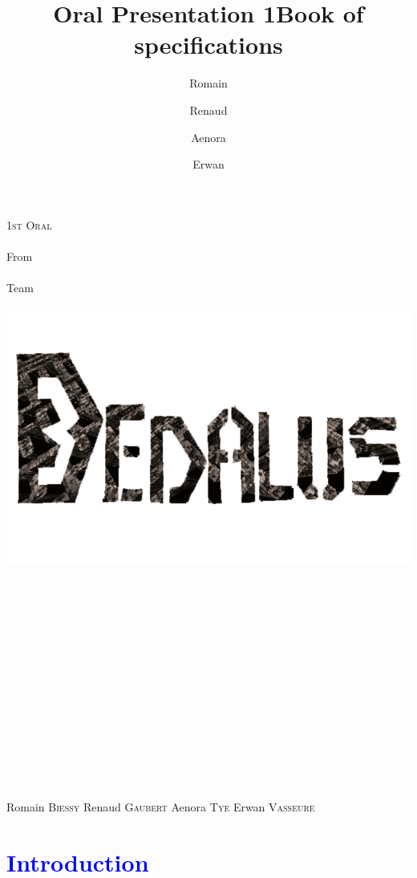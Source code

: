 \documentclass[article]{report} %
\title {Oral Presentation 1}
\title {Book of specifications}
\author {Romain\and Renaud\and Aenora\and Erwan}
\date {}
\begin{document}
	\thispagestyle{empty}
  	\begin{titlepage} 
		\vspace*{1cm} 
  		\begin{center} 
  			{\huge{\textsc{1st Oral} \\ ~ \\{\large From}\\ ~\\ Team \\  ~ \\ }}
	  		\includegraphics[width = 14cm]{images/Titles/Dedalus.png}
			\\ ~ \\ ~ \\ ~ \\ ~ \\ ~ \\ ~ \\ ~ \\ ~ \\ ~ \\ ~ \\ ~ \\ ~ \\ ~ \\ ~ 
		\end{center}
  		\hfill {\large Romain \textsc{Biessy}}
  		\hfill {\large Renaud \textsc{Gaubert}}
  		\hfill {\large Aenora \textsc{Tye}}
  		\hfill {\large Erwan  \textsc{Vasseure}}
  	\end{titlepage} 

  	\tableofcontents
  		\newpage
		
		\chapter{\textcolor{blue}{Introduction}}
 											
\end{document}
